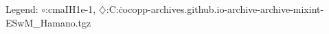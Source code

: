 Legend: {\color{CornflowerBlue}$\circ$}:cmaIH1e-1, {\color{Orange}$\diamondsuit$}:C:\Users\tristan\.cocopp\data-archives\numbbo.github.io\data-archive\data-archive\bbob-mixint\CMA-ESwM\_Hamano.tgz
